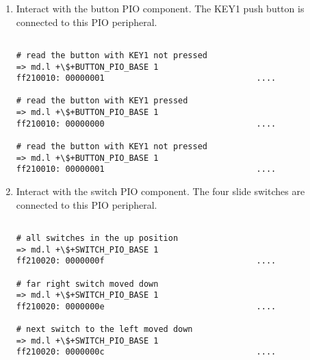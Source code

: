 \begin{flushleft}
\begin{enumerate}[
	label=\textbf{Step \arabic*.},
	leftmargin=*,
	widest={00},
	align=left]
\begin{enumerate}[
	label=\textbf{Step \arabic{enumi}\alph*.},
	leftmargin=*,
	align=left]
\begin{verbatim}
\end{verbatim}

After executing the first command, the LEDs should all turn off, returned to their reset state.  Do not forget to release the reset by clearing that bit with the second command.  You can trigger the same reset effect by pressing the KEY0 push button.  Turn on some LEDs again and try pressing KEY0 to prove that as well.
\newline
\newline
Please note that resetting the FPGA logic design while software is running on the HPS core can be dangerous for the software environment.  If software drivers are interacting with FPGA logic at the time you invoke a reset like this, the hardware transactions can hang which causes the software environment to hang.  So resetting part of the hardware system like this should be done with caution.

\item Interact with the button PIO component.  The KEY1 push button is connected to this PIO peripheral.

\begin{verbatim}

# read the button with KEY1 not pressed
=> md.l +\$+BUTTON_PIO_BASE 1
ff210010: 00000001                               ....

# read the button with KEY1 pressed
=> md.l +\$+BUTTON_PIO_BASE 1
ff210010: 00000000                               ....

# read the button with KEY1 not pressed
=> md.l +\$+BUTTON_PIO_BASE 1
ff210010: 00000001                               ....

\end{verbatim}

\item Interact with the switch PIO component.  The four slide switches are connected to this PIO peripheral.

\begin{verbatim}

# all switches in the up position
=> md.l +\$+SWITCH_PIO_BASE 1
ff210020: 0000000f                               ....

# far right switch moved down
=> md.l +\$+SWITCH_PIO_BASE 1
ff210020: 0000000e                               ....

# next switch to the left moved down
=> md.l +\$+SWITCH_PIO_BASE 1
ff210020: 0000000c                               ....


\end{verbatim}
\end{enumerate}
\end{enumerate}
\end{flushleft}

